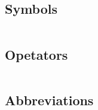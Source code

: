 
\subsection*{Symbols}

\begin{tabular}{ll}

\end{tabular}

\subsection*{Opetators} 

\begin{tabular}{ll}

\end{tabular}

\subsection*{Abbreviations}

